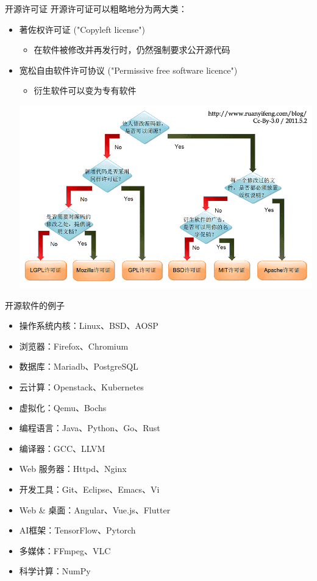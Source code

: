 \documentclass{beamer}
\begin{document}
\begin{frame}[label={sec:org62b9030}]{开源许可证}
开源许可证可以粗略地分为两大类：
\begin{itemize}
\item 著佐权许可证 ("Copyleft license")
\begin{itemize}
\item 在软件被修改并再发行时，仍然强制要求公开源代码
\end{itemize}
\item 宽松自由软件许可协议 ("Permissive free software licence")
\begin{itemize}
\item 衍生软件可以变为专有软件
\end{itemize}
\begin{center}
\includegraphics[width=.9\linewidth]{../assets/static/opensource/license.png}
\end{center}
\end{itemize}
\end{frame}

\begin{frame}[label={sec:orgc98b2f2}]{开源软件的例子}
\begin{itemize}
\item 操作系统内核：Linux、BSD、AOSP
\item 浏览器：Firefox、Chromium
\item 数据库：Mariadb、PostgreSQL
\item 云计算：Openstack、Kubernetes
\item 虚拟化：Qemu、Bochs
\item 编程语言：Java、Python、Go、Rust
\item 编译器：GCC、LLVM
\item Web 服务器：Httpd、Nginx
\item 开发工具：Git、Eclipse、Emacs、Vi
\item Web \& 桌面：Angular、Vue.js、Flutter
\item AI框架：TensorFlow、Pytorch
\item 多媒体：FFmpeg、VLC
\item 科学计算：NumPy
\end{itemize}
\end{frame}
\end{document}
